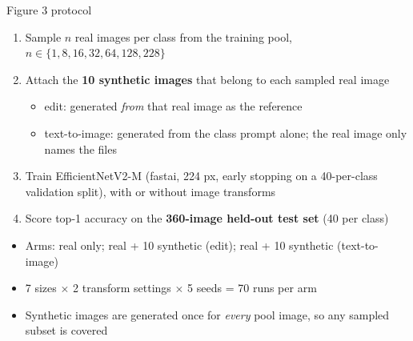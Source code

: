 \documentclass[aspectratio=169,11pt]{beamer}
\begin{document}
\begin{frame}{Figure 3 protocol}
  \begin{enumerate}
    \item Sample $n$ real images per class from the training pool, $n \in \{1, 8, 16, 32, 64, 128, 228\}$
    \item Attach the \textbf{10 synthetic images} that belong to each sampled real image
      \begin{itemize}
        \item edit: generated \emph{from} that real image as the reference
        \item text-to-image: generated from the class prompt alone; the real image only names the files
      \end{itemize}
    \item Train EfficientNetV2-M (fastai, 224 px, early stopping on a 40-per-class validation split), with or without image transforms
    \item Score top-1 accuracy on the \textbf{360-image held-out test set} (40 per class)
  \end{enumerate}
  \vspace{0.6em}
  \begin{itemize}
    \item Arms: real only; real + 10 synthetic (edit); real + 10 synthetic (text-to-image)
    \item 7 sizes $\times$ 2 transform settings $\times$ 5 seeds = 70 runs per arm
    \item Synthetic images are generated once for \emph{every} pool image, so any sampled subset is covered
  \end{itemize}
\end{frame}
\end{document}
